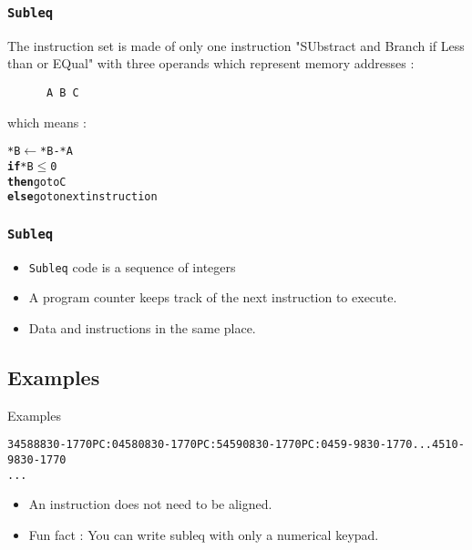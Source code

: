 \documentclass{beamer}
\begin{document}
\begin{frame}[fragile]
    \frametitle{\texttt{Subleq}}
    The instruction set is made of only one instruction
    "SUbstract and Branch if Less than or EQual" with three
    operands which represent memory addresses :
    \\[11pt]
    \begin{verbatim}
      A B C
    \end{verbatim}
    \pause
    which means :

    \begin{alltt}
       *B \(\leftarrow\) *B - *A
      {\bf if} *B \(\leq\) 0
      {\bf then} go to C
      {\bf else} go to next instruction
    \end{alltt}
\end{frame}

\begin{frame}
  \frametitle{\texttt{Subleq}}
  \begin{itemize}
    \item \texttt{Subleq} code is a sequence of integers%
    \item<2-> A program counter keeps track of the next instruction to execute.
    \item<3-> Data and instructions in the same place.
  \end{itemize}
\end{frame}

\subsection{Examples}
\begin{frame}[fragile]{Examples}
  \begin{alltt}
  3  4  5   8  8   8  3  0  -1  7  7  0    PC : 0  4  5   8  0   8  3  0  -1  7  7  0    PC : 5  4  5   9  0   8  3  0  -1  7  7  0    PC : 0  4  5   9 -9   8  3  0  -1  7  7  0   ...  4  5  10 -9   8  3  0  -1  7  7  0
  ...
  \end{alltt}
  \begin{itemize}
    \item<6-> An instruction does not need to be aligned.
    \item<7-> Fun fact : You can write subleq with only a numerical keypad.
  \end{itemize}
\end{frame}
\end{document}
